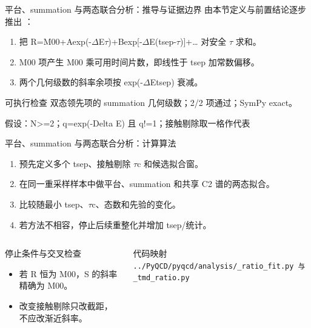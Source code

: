 \begin{frame}[t]{平台、summation 与两态联合分析：推导与证据边界}
\footnotesize
{}\quad 由本节定义与前置结论逐步推出 ：
\begin{enumerate}
\item 把 R=M00+Aexp(-\ensuremath{\Delta}E\ensuremath{\tau})+Bexp[-\ensuremath{\Delta}E(tsep-\ensuremath{\tau})]+… 对安全 \ensuremath{\tau} 求和。
\item M00 项产生 M00 乘可用时间片数，即线性于 tsep 加常数偏移。
\item 两个几何级数的斜率余项按 exp(-\ensuremath{\Delta}Etsep) 衰减。
\end{enumerate}\begin{block}{可执行检查}
\quad 双态领先项的 summation 几何级数；2/2 项通过；SymPy exact。
\par\scriptsize 假设：N>=2；q=exp(-Delta E) 且 q!=1；接触剔除取一格作代表
\end{block}
\end{frame}

\begin{frame}[t]{平台、summation 与两态联合分析：计算算法}
\footnotesize
{}\begin{enumerate}
\item 预先定义多个 tsep、接触剔除 \ensuremath{\tau}c 和候选拟合窗。
\item 在同一重采样样本中做平台、summation 和共享 C2 谱的两态拟合。
\item 比较随最小 tsep、\ensuremath{\tau}c、态数和先验的变化。
\item 若方法不相容，停止后续重整化并增加 tsep/\allowbreak{}统计。
\end{enumerate}\begin{columns}[T,onlytextwidth]
\begin{block}{停止条件与交叉检查}\scriptsize\begin{itemize}
\item[\CheckMark] 若 R 恒为 M00，S 的斜率精确为 M00。
\item[\CheckMark] 改变接触剔除只改截距，不应改渐近斜率。
\end{itemize}\end{block}
\begin{block}{代码映射}
\scriptsize \texttt{.\allowbreak{}.\allowbreak{}/\allowbreak{}PyQCD/\allowbreak{}pyqcd/\allowbreak{}analysis/\allowbreak{}\_\allowbreak{}ratio\_\allowbreak{}fit.\allowbreak{}py 与 \_\allowbreak{}tmd\_\allowbreak{}ratio.\allowbreak{}py}
\end{block}\end{columns}\end{frame}

